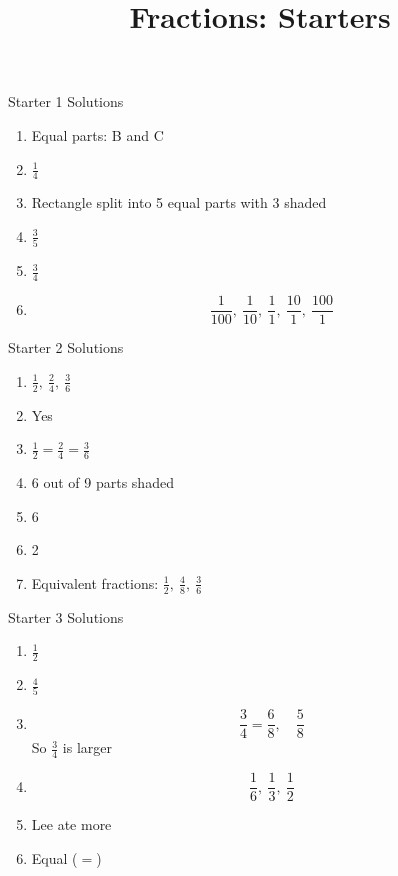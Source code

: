 \documentclass{beamer}
\title{Fractions: Starters}
\author{}
\date{}
\begin{document}
\frame{\titlepage}
\begin{frame}{Starter 1 Solutions}

\begin{enumerate}
\item Equal parts: B and C
\item $\frac{1}{4}$
\item Rectangle split into 5 equal parts with 3 shaded
\item $\frac{3}{5}$
\item $\frac{3}{4}$
\item 
\[
\frac{1}{100},\ \frac{1}{10},\ \frac{1}{1},\ \frac{10}{1},\ \frac{100}{1}
\]
\end{enumerate}

\end{frame}



\begin{frame}{Starter 2 Solutions}

\begin{enumerate}
\item $\frac{1}{2},\ \frac{2}{4},\ \frac{3}{6}$
\item Yes
\item $\frac{1}{2} = \frac{2}{4} = \frac{3}{6}$
\item 6 out of 9 parts shaded
\item 6
\item 2
\item Equivalent fractions: $\frac{1}{2},\ \frac{4}{8},\ \frac{3}{6}$
\end{enumerate}

\end{frame}



\begin{frame}{Starter 3 Solutions}

\begin{enumerate}
\item $\frac{1}{2}$
\item $\frac{4}{5}$
\item 
\[
\frac{3}{4} = \frac{6}{8},\quad \frac{5}{8}
\]
So $\frac{3}{4}$ is larger
\item 
\[
\frac{1}{6},\ \frac{1}{3},\ \frac{1}{2}
\]
\item Lee ate more
\item Equal ($=$)
\end{enumerate}

\end{frame}
\end{document}
